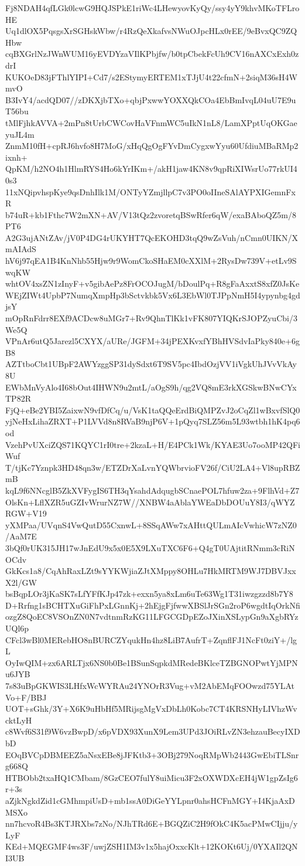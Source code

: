 Fj8NDAH4qfLGk0lcwG9HQJSPkE1riWc4LHewyovKyQy/ssy4yY9khvMKoTFLroHE
Uq1dlOX5PqsgsXrSGHskWbw/r4RzQeXkafvsNWuOJpcHLx0rEE/9eBvxQC9ZQHbw
cqBXGrlNzJWnWUM16yEVDYzaVIlKPbjfw/b0tpCbekFcUh9CV16nAXCxExh0zdrI
KUKOeD83jFThlYIPI+Cd7/s2EStymyERTEM1xTJjU4t22cfmN+2siqM36sH4WmvO
B3IvY4/acdQD07//zDKXjbTXo+qbjPxwwYOXXQkCOa4EbBmIvqL04uU7E9uT56bu
tMlFjhkAVVA+2mPn8tUrbCWCovHaVFnmWC5uIkN1nL8/LamXPptUqOKGaeyuJL4m
ZnmM10fH+cpRJ6hvfo8H7MoG/xHqQgOgFYvDmCygxwYyu60UfdiuMBaRMp2ixnh+
QpKM/h2NO4h1HlmRYS4Ho6kYrIKm+/akH1jaw4KN8v9qpRiXIWsrUo77rkUI40s3
11xNQipvhspKye9qsDnhIlk1M/ONTyYZmjllpC7v3PO0oIIneSAlAYPXIGemnFxR
b74uR+kb1Fthc7W2mXN+AV/V13tQz2zvoretqBSwRfer6qW/exaBAboQZ5m/8PT6
A2G3ujANtZAv/jV0P4DG4rUKYHT7QcEKOHD3tqQ9wZsVuh/nCmn0UIKN/XmAIAdS
hV6j97qEA1B4KnNhb55Hjw9r9WomCkoSHaEM0cXXlM+2RysDw739V+etLv9SwqKW
whtOV4xsZN1zInyF+v5gibAePz8FrOCOJugM/bDoulPq+R8gFaAxxtS8xfZ0JsKe
WEjZIWt4UpbP7NumqXmpHp3bSctvkbk5Vx6L3EbWl0TJPpNmH5I4ypynbg4gdjsY
mOpRnFdrr8EXf9ACDcw8uMGr7+Rv9QhnTlKk1vFK807YIQKrSJOPZyuCbi/3We5Q
VPnAr6utQ5Jarezl5CXYX/aURe/JGFM+34jPEXKvxfYBhHVSdvIaPky840e+6gB8
AZTtboCbt1UBpF2AWYzggSP31dySdxt6T9SV5pc4IbdOzjVV1iVgkUhJVvVkAy8U
EWbMnVyAlo4I68bOut4IHWN9u2mtL/aOgS9h/qg2VQ8mE3rkXGSkwBNwCYxTP82R
FjQ+eBe2YBI5ZaixwN9vfDfCq/u/VsK1taQQeErdBiQMPZvJ2oCqZl1wBxvfSlQ0
yjNeHxLihaZRXT+P1LVVd8n8RVaB9njP6V+1pQyq7SLZ56m5L93wtbh1hK4pq6od
VzehPvUXciZQS71KQYC1rI0tre+2kzaL+H/E4PCk1Wk/KYAE3Uo7ooMP42QFiWuf
T/tjKc7Yznpk3HD48qn3w/ETZDrXaLvnYQWbrvioFV26f/CiU2LA4+Vl8upRBZmB
kqL9f6NNcglB5ZkXVFygIS6TH3qYsahdAdqugbSCnaePOL7hfuw2za+9FlhVd+Z7
OlsKn+LflXZR5uGZIvWrurNZ7W//XNBW4aAblaYWEaDbDOUuY8I3/qWYZRGW+V19
yXMPaa/UVqnS4VwQutD55CxnwL+8SSqAWw7xAHttQULmAIcVwhicW7zNZ0/AaM7E
3bQf0rUK315JH17wJnEdU9x5x0E5X9LXuTXC6F6+Q4gT0UAjtitRNmm3cRiNOCdv
GkKcs1a8/CqAhRaxLZt9sYYKWjiaZJtXMppy8OHLu7HkMRTM9WJ7DBVJxxX2l/GW
bsBqpLOr3jKaSK7sLfYFfKJp47zk+exxn5ya8xLm6uTe63Wg1T31iwzgzzd8b7Y8
D+Rrfng1sBCHTXuGiFhPxLGnnKj+2hEjgFjfwwXBSlJrSGn2roP6wgdtIqOrkNfi
ozgZ8QoEC8VSOnZN0N7vdtnmRzKG11LFGCGDpEZoJXinXSLypGn9aXgbRYzUQl6p
CFcl3wBl0MERebHO8nBURCZYqukHn4hz8LiB7AufrT+ZqnflFJ1NcFt0ziY+/lgL
OyIwQIM+zx6ARLTjx6NS0b0Be1BSunSqpkdMRedeBKlceTZBGNOPwtYjMPNu6JYB
7s83uBpGKWIS3LHfxWcWYRAu24YNOrR3Vug+vM2AbEMqFOOwzd75YLAtVo+F/BBJ
UOT+sGhk/3Y+X6K9uHbHf5MRijsgMgVxDbLh0Kobc7CT4KRSNHyLIVhzWvcktLyH
c8Wvf6S31f9W6vzBwpD/x6pVDX93XunX9Lem3UPd3JOiRLvZN3ehzauBecyIXDbD
EOqBVCpDBMEEZ5aNsxEBe8jJFKtb3+3OBj279NoqRMpWb2443GwEbiTLSnrg668Q
HTBObb2txaHQ1CMbam/8GzCEO7fulY8uiMicu3F2xOXWDXcEH4jW1gpZsIg6r+3s
aZjkNgkdZid1cGMhmpiUsD+mb1ssA0DiGeYYLpnr0ahsHCFnMGY+I4KjaAxDMSXo
nn7hcvoR4Bs3KTJRXbs7zNo/NJhTRd6E+BGQZiC2H9fOkC4K5acPMwCIjju/yLyF
KEd+MQEGMF4ws3F/uwjZSH1IM3v1x5hajOxxcKlt+12KOKt6Uj/0YXAIl2QNI3UB

